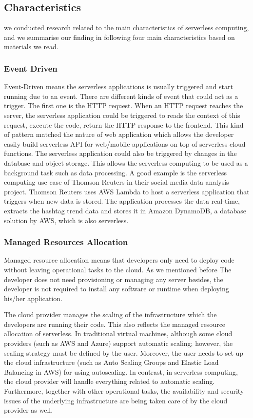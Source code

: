\subsection{Characteristics}
we conducted research related to the main characteristics of serverless computing, and we summarise our finding in following four main characteristics based on materials \cite{castro2019rise}\cite{lee2018evaluation}\cite{jonas2019cloud} we read.
\subsubsection{Event Driven}
Event-Driven means the serverless applications is usually triggered and start running due to an event. There are different kinds of event that could act as a trigger. The first one is the HTTP request. When an HTTP request reaches the server, the serverless application could be triggered to reads the context of this request, execute the code, return the HTTP response to the frontend. This kind of pattern matched the nature of web application which allows the developer easily build serverless API for web/mobile applications on top of serverless cloud functions. The serverless application could also be triggered by changes in the database and object storage. This allows the serverless computing to be used as a background task such as data processing. A good example is the serverless computing use case of Thomson Reuters in their social media data analysis project\cite{ThomsonR38:online}. Thomson Reuters uses AWS Lambda to host a serverless application that triggers when new data is stored. The application processes the data real-time, extracts the hashtag trend data and stores it in Amazon DynamoDB, a database solution by AWS, which is also serverless.
\subsubsection{Managed Resources Allocation}
Managed resource allocation means that developers only need to deploy code without leaving operational tasks to the cloud. As we mentioned before The developer does not need provisioning or managing any server besides, the developer is not required to install any software or runtime \cite{Serverle64:online} when deploying his/her application. 
\par
The cloud provider manages the scaling of the infrastructure which the developers are running their code. This also reflects the managed resource allocation of serverless. In traditional virtual machines, although some cloud providers (such as AWS and Azure) support automatic scaling; however, the scaling strategy must be defined by the user. Moreover, the user needs to set up the cloud infrastructure (such as Auto Scaling Groups and Elastic Load Balancing in AWS) for using autoscaling. In contrast, in serverless computing, the cloud provider will handle everything related to automatic scaling.
Furthermore, together with other operational tasks, the availability and security issues of the underlying infrastructure are being taken care of by the cloud provider as well. 
